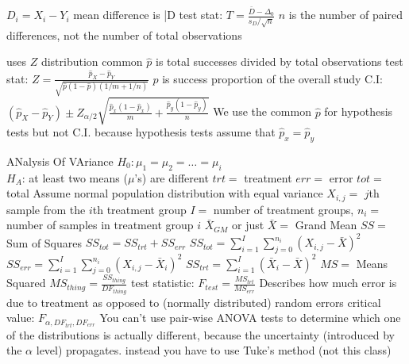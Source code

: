 \documentclass{article}
\begin{document}
\begin{multicols*}{2}
\begin{outline}[compactitem]
  \1 $D_i = X_i - Y_i$ mean difference is \bar{D}
  \1 test stat: $T = \frac{\bar{D}-\Delta_0}{s_D / \sqrt{n}}$
    \2 $n$ is the number of paired differences, not the number of total observations

  \1 uses $Z$ distribution
  \1 common $\hat{p}$ is total successes divided by total observations
  \1 test stat: $Z = \frac{\hat{p}_X - \hat{p}_Y}{\sqrt{\hat{p}(1-\hat{p})(1/m+1/n)}}$
    \2 $\hat{p}$ is success proportion of the overall study
  \1 C.I: $(\hat{p}_X - \hat{p}_Y) \pm Z_{\alpha/2}
    \sqrt{
      \frac{\hat{p}_x(1-\hat{p}_x)}{m} + 
      \frac{\hat{p}_y(1-\hat{p}_y)}{n}
    }$
  \1 We use the common $\hat{p}$ for hypothesis tests but not C.I. because hypothesis tests assume that $\hat{p}_x = \hat{p}_y$

  \1 ANalysis Of VAriance
  \1 $H_0: \mu_1 = \mu_2 = \ldots = \mu_i$
  \\ $H_A$: at least two means ($\mu$'s) are different
  \1 $trt=$ treatment
  \1 $err=$ error
  \1 $tot=$ total
  \1 Assume normal population distribution with equal variance
  \1 $X_{i,j}=$ $j$th sample from the $i$th treatment group
    \2 $I=$ number of treatment groups, $n_i=$ number of samples in treatment group $i$
  \1 $\bar{X}_{GM}$ or just $\bar{X} = $ Grand Mean
  \1 $SS=$ Sum of Squares
    \2 $SS_{tot}=SS_{trt} + SS_{err}$
    \2 $SS_{tot}=\sum_{i=1}^I \sum_{j=0}^{n_i} \left( X_{i,j} - \bar{X} \right)^2 $
    \2 $SS_{err}=\sum_{i=1}^I \sum_{j=0}^{n_i} \left( X_{i,j} - \bar{X}_i \right)^2 $
    \2 $SS_{trt}=\sum_{i=1}^I \left( \bar{X}_i - \bar{X} \right)^2 $
    \2 
  \1 $MS=$ Means Squared
    \2 $MS_{thing} = \frac{SS_{thing}}{DF_{thing}}$
  \1 test statistic: $F_{test}=\frac{MS_{trt}}{MS_{err}}$
    \2 Describes how much error is due to treatment as opposed to (normally distributed) random errors
  \1 critical value: $F_{\alpha, DF_{trt}, DF_{err}}$
  \1 You can't use pair-wise ANOVA tests to determine which one of the distributions is actually different, because the uncertainty (introduced by the $\alpha$ level) propagates.
    \2 instead you have to use Tuke's method (not this class)


\end{outline}
\end{multicols*}
\end{document}

